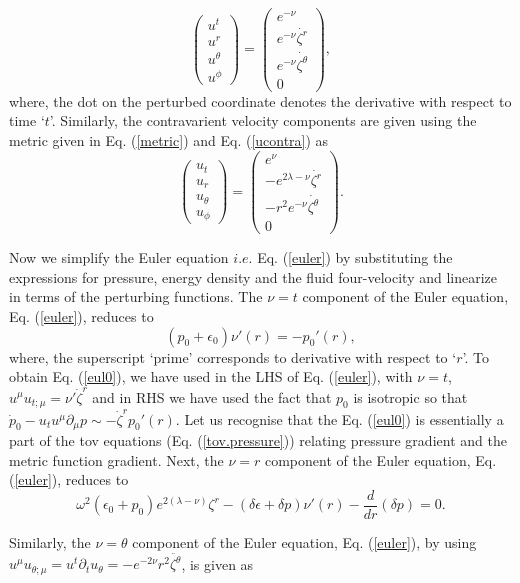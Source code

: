 \documentclass[a4paper, 11pt]{article}
\def\be{\begin{equation}}
\def\ee{\end{equation}}
\begin{document}
\be
\begin{pmatrix} u^t\\u^r\\u^\theta\\u^\phi\end{pmatrix}=\begin{pmatrix}
e^{-\nu}\\ e^{-\nu}\dot{\zeta^r}\\e^{-\nu}\dot{\zeta^\theta}\\0\end{pmatrix}, \label{ucontra}
\ee
where, the dot on the perturbed coordinate denotes the derivative with respect to time `$t$'. Similarly, the contravarient velocity components are given using the metric given in Eq. (\ref{metric}) and Eq. (\ref{ucontra}) as
\be
\begin{pmatrix} u_t\\u_r\\u_\theta\\u_\phi\end{pmatrix}=\begin{pmatrix}
e^{\nu}\\- e^{2\lambda-\nu}\dot{\zeta^r}\\-r^2e^{-\nu}\dot{\zeta^\theta}\\0\end{pmatrix}. \label{ucov}
\ee

Now we simplify the Euler equation $i.e.$ Eq. (\ref{euler}) by substituting the expressions for pressure, energy density and the fluid four-velocity and linearize in terms of the perturbing functions. The $\nu=t$ component of the Euler equation, Eq. (\ref{euler}), reduces to
\be
(p_0+\epsilon_0)\nu'(r)=-p_0'(r), \label{eul0}
\ee
where, the superscript `prime' corresponds to derivative with respect to `$r$'. To obtain Eq. (\ref{eul0}), we have used in the LHS of Eq. (\ref{euler}), with $\nu=t$, $u^\mu u_{t;\mu}=\nu'\dot\zeta^r$ and in RHS we have used the fact that $p_0$ is isotropic so that $\dot p_0-u_tu^\mu\partial_\mu p\sim -\dot\zeta^r p_0'(r)$. Let us recognise that the Eq. (\ref{eul0}) is essentially a part of the \ac{tov} equations (Eq. (\ref{tov.pressure})) relating pressure gradient and the metric function gradient. Next, the $\nu=r$ component of the Euler equation, Eq. (\ref{euler}), reduces to
\be
\omega^2(\epsilon_0 + p_0)e^{2(\lambda-\nu)}\zeta^r-(\delta\epsilon+\delta p)\nu'(r)-\frac{d}{dr}(\delta p)=0. \label{eulr}
\ee 

Similarly, the $\nu=\theta$ component of the Euler equation, Eq. (\ref{euler}), by using $u^\mu u_{\theta;\mu} = u^t\partial_t u_\theta=-e^{-2\nu} r^2\ddot{\zeta^\theta}$, is given as
\end{document}
